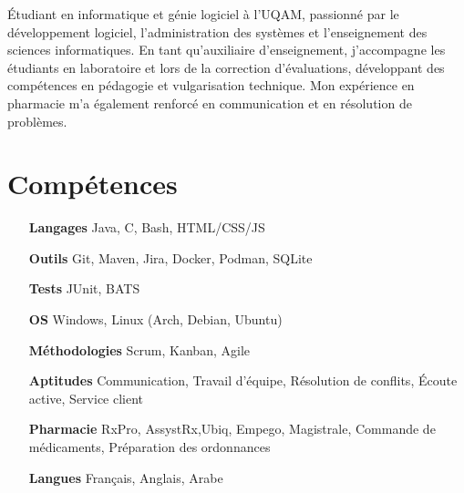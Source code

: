 \documentclass[letterpaper,10pt]{article}
\begin{document}


  Étudiant en informatique et génie logiciel à l’UQAM, passionné par le développement logiciel, l’administration des systèmes et l'enseignement des sciences informatiques. En tant qu’auxiliaire d’enseignement, j’accompagne les étudiants en laboratoire et lors de la correction d’évaluations, développant des compétences en pédagogie et vulgarisation technique. Mon expérience en pharmacie m’a également renforcé en communication et en résolution de problèmes.


  \section{Compétences}

  \begin{multicols}{2}
    \begin{itemize}[itemsep=-2px, parsep=5pt, leftmargin=75pt]
      \item[\textbf{Langages}] Java, C, Bash, HTML/CSS/JS
      \item[\textbf{Outils}] Git, Maven, Jira, Docker, Podman, SQLite
      \item[\textbf{Tests}] JUnit, BATS
      \item[\textbf{OS}]  Windows, Linux (Arch, Debian, Ubuntu)
      \item[\textbf{Méthodologies}]  Scrum, Kanban, Agile
      \item[\textbf{Aptitudes}]  Communication, Travail d'équipe, Résolution de conflits, Écoute active, Service client
      \item[\textbf{Pharmacie}]  RxPro, AssystRx,Ubiq, Empego, Magistrale, Commande de médicaments, Préparation des ordonnances
      \item[\textbf{Langues}]  Français, Anglais, Arabe
    \end{itemize}
  \end{multicols}
\end{document}
